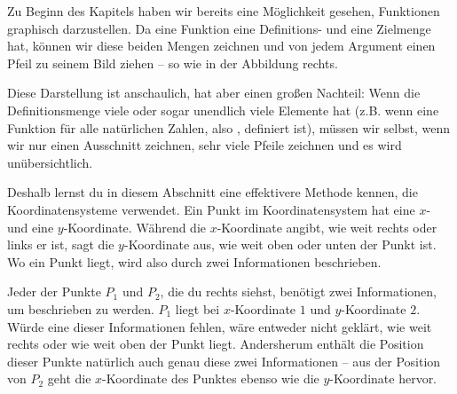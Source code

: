 \documentclass[../../main.tex]{subfiles}
\begin{document}
\label{sec:abbildungen_graphen_intro}
\parpic[r]{
    \centering
}

Zu Beginn des Kapitels haben wir bereits eine Möglichkeit gesehen, Funktionen graphisch darzustellen. Da eine Funktion eine Definitions- und eine Zielmenge hat, können wir diese beiden Mengen zeichnen und von jedem Argument einen Pfeil zu seinem Bild ziehen -- so wie in der Abbildung rechts. 

Diese Darstellung ist anschaulich, hat aber einen großen Nachteil: Wenn die Definitionsmenge viele oder sogar unendlich viele Elemente hat (z.B. wenn eine Funktion für alle natürlichen Zahlen, also \Natural, definiert ist), müssen wir selbst, wenn wir nur einen Ausschnitt zeichnen, sehr viele Pfeile zeichnen und es wird unübersichtlich.

Deshalb lernst du in diesem Abschnitt eine effektivere Methode kennen, die Koordinatensysteme verwendet. Ein Punkt im Koordinatensystem hat eine $x$- und eine $y$-Koordinate. Während die $x$-Koordinate angibt, wie weit rechts oder links er ist, sagt die $y$-Koordinate aus, wie weit oben oder unten der Punkt ist. Wo ein Punkt liegt, wird also durch zwei Informationen beschrieben.


Jeder der Punkte $P_1$ und $P_2$, die du rechts siehst, benötigt zwei Informationen, um beschrieben zu werden. $P_1$ liegt bei $x$-Koordinate $1$ und $y$-Koordinate $2$. Würde eine dieser Informationen fehlen, wäre entweder nicht geklärt, wie weit rechts oder wie weit oben der Punkt liegt. Andersherum enthält die Position dieser Punkte natürlich auch genau diese zwei Informationen -- aus der Position von $P_2$ geht die $x$-Koordinate des Punktes ebenso wie die $y$-Koordinate hervor.
\end{document}
